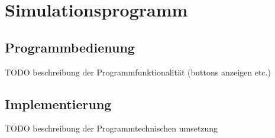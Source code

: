 \chapter{Simulationsprogramm}

\section{Programmbedienung}
TODO beschreibung der Programmfunktionalität (buttons anzeigen etc.)

\section{Implementierung}
TODO beschreibung der Programmtechnischen umsetzung
